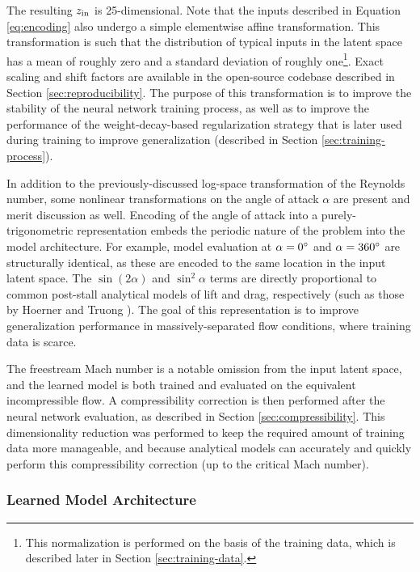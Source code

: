 \documentclass[journal]{new-aiaa}
\begin{document}
The resulting $z_{\rm in}$ is 25-dimensional. Note that the inputs described in Equation \ref{eq:encoding} also undergo a simple elementwise affine transformation. This transformation is such that the distribution of typical inputs in the latent space has a mean of roughly zero and a standard deviation of roughly one\footnote{This normalization is performed on the basis of the training data, which is described later in Section \ref{sec:training-data}.}. Exact scaling and shift factors are available in the open-source codebase described in Section \ref{sec:reproducibility}. The purpose of this transformation is to improve the stability of the neural network training process, as well as to improve the performance of the weight-decay-based regularization strategy that is later used during training to improve generalization (described in Section \ref{sec:training-process}).

In addition to the previously-discussed log-space transformation of the Reynolds number, some nonlinear transformations on the angle of attack $\alpha$ are present and merit discussion as well. Encoding of the angle of attack into a purely-trigonometric representation embeds the periodic nature of the problem into the model architecture. For example, model evaluation at $\alpha=0\degree$ and $\alpha=360\degree$ are structurally identical, as these are encoded to the same location in the input latent space. The $\sin(2\alpha)$ and $\sin^2\alpha$ terms are directly proportional to common post-stall analytical models of lift and drag, respectively (such as those by Hoerner and Truong \cite{hoernerFluidDynamicLift1985, truongAnalyticalModelAirfoil2020}). The goal of this representation is to improve generalization performance in massively-separated flow conditions, where training data is scarce.

The freestream Mach number is a notable omission from the input latent space, and the learned model is both trained and evaluated on the equivalent incompressible flow. A compressibility correction is then performed after the neural network evaluation, as described in Section \ref{sec:compressibility}. This dimensionality reduction was performed to keep the required amount of training data more manageable, and because analytical models can accurately and quickly perform this compressibility correction (up to the critical Mach number).

\subsubsection{Learned Model Architecture}
\label{sec:learned-model-architecture}
\end{document}
